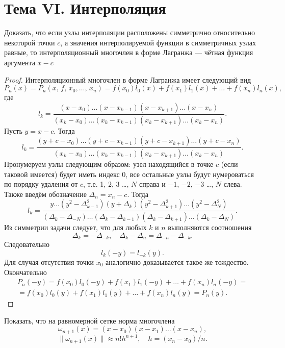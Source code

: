 \documentclass[a4paper]{article}
\begin{document}
\section*{Тема VI. Интерполяция}
\begin{hiProb}[7.3]
Доказать, что если узлы интерполяции расположены симметрично
относительно некоторой точки $c$, а значения интерполируемой
функции в симметричных узлах равные, то интерполяционный
многочлен в форме Лагранжа --- чётная функция аргумента $x-c$
\end{hiProb}
\begin{proof}
Интерполяционный многочлен в форме Лагранжа имеет следующий вид
\[
	P_n(x)=P_n(x,\,f,\,x_0,\ldots,\,x_n)=f(x_0)l_0(x)+
	f(x_1)l_1(x)+\ldots+f(x_{n})l_n(x)
,\] 
где
\[
	l_k= \frac{(x-x_0)\ldots(x-x_{k-1})(x-x_{k+1})\ldots
	(x-x_{n})}{(x_k-x_0)\ldots(x_k-x_{k-1})(x_k-x_{k+1})\ldots
(x_k-x_n)}
.\] 
Пусть $y=x-c$. Тогда
\[
	l_k= \frac{(y+c-x_0)\ldots(y+c-x_{k-1})(y+c-x_{k+1})\ldots
	(y+c-x_{n})}{(x_k-x_0)\ldots(x_k-x_{k-1})(x_k-x_{k+1})\ldots
(x_k-x_n)}
.\]
Пронумеруем узлы следующим образом: узел находящийся в точке $c$ (если таковой имеется) будет иметь индекс 0, все остальные узлы
будут нумероваться по порядку удаления от $c$, т.\:е. 1, 2, 3 \ldots, $N$ справа и $-1$, $-2$, $-3$ \ldots, $N$ слева.
Также введём обозначение
$\Delta_n=x_n-c$.
Тогда
\[
	l_k= \frac{y\ldots (y^2 -\Delta_{k-1}^2)(y+\Delta_k)
	(y^2-\Delta_{k+1}^2)\ldots (y^2-\Delta_{N}^2)}{
(\Delta_k-\Delta_{-N}) \ldots(\Delta_k-\Delta_{k-1})(\Delta_k-\Delta_{k+1})\ldots(\Delta_k-\Delta_N)}
.\] 
Из симметрии задачи следует, что для любых $k$ и $n$ выполняются
соотношения
\[
\Delta_k=-\Delta_{-k},\quad\Delta_k-\Delta_n=\Delta_{-n}-\Delta_{-k}
.\] 
Следовательно
\[
	l_k(-y)=l_{-k}(y)
.\] 
Для случая отсутствия точки $x_0$ аналогично доказывается
такое же тождество.
Окончательно
\begin{multline*}
	P_n(-y)=f(x_0)l_0(-y)+
	f(x_1)l_1(-y)+\ldots+f(x_{n})l_n(-y)=\\=
	f(x_0)l_0(y)+ f(x_1)l_1 (y)+\ldots +
	f(x_{n})l_n(y)=P_n(y)
.\end{multline*}
\end{proof}
\begin{hiProb}[7.11]
	Показать, что на равномерной сетке норма многочлена
	\[
		\omega_{n+1}(x)=(x-x_0)(x-x_1)\ldots (x-x_n)
	,\]
	\[
		\| \omega_{n+1}(x)\|\approx n! h^{n+1},\quad
		h=(x_n-x_0)/n
	.\] 
\end{hiProb}
\end{document}
